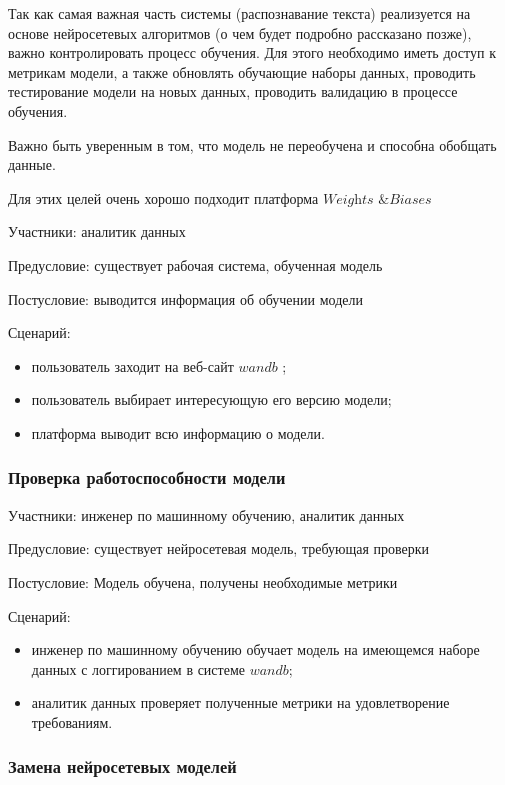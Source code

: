Так как самая важная часть системы (распознавание текста) реализуется на основе нейросетевых алгоритмов (о чем будет подробно рассказано позже), важно контролировать процесс обучения.
Для этого необходимо иметь доступ к метрикам модели, а также обновлять обучающие наборы данных, проводить тестирование модели на новых данных, проводить валидацию в процессе обучения.

Важно быть уверенным в том, что модель не переобучена и способна обобщать данные.

Для этих целей очень хорошо подходит платформа $\textit{Weights \& Biases}$ \cite{wandb}

Участники: аналитик данных

Предусловие: существует рабочая система, обученная модель

Постусловие: выводится информация об обучении модели

Сценарий:
\begin{itemize}
    \item пользователь заходит на веб-сайт $wandb$ \cite{wandb};
    \item пользователь выбирает интересующую его версию модели; 
    \item платформа выводит всю информацию о модели.
\end{itemize}

\subsubsection{Проверка работоспособности модели}

Участники: инженер по машинному обучению, аналитик данных

Предусловие: существует нейросетевая модель, требующая проверки

Постусловие: Модель обучена, получены необходимые метрики

Сценарий:
\begin{itemize}
    \item инженер по машинному обучению обучает модель на имеющемся наборе данных с логгированием в системе $wandb$;
    \item аналитик данных проверяет полученные метрики на удовлетворение требованиям.
\end{itemize}

\subsubsection{Замена нейросетевых моделей}

